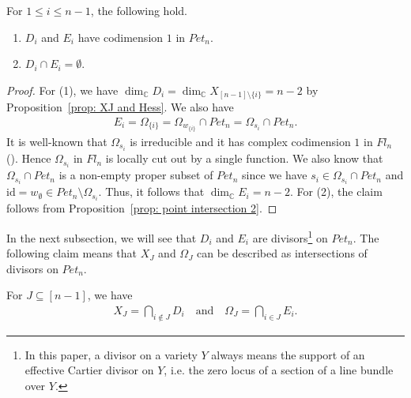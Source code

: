 \begin{lemma}\label{lem: divisors}
For $1\le i\le n-1$, the following hold. 
\begin{enumerate}
 \item $D_{i}$ and $E_{i}$ have codimension $1$ in $Pet_{n}$.
 \item $D_{i}\cap E_{i} = \emptyset$.
\end{enumerate}
\end{lemma}

\begin{proof}
For (1), we have $\dim_{{\mathbb C}}D_i=\dim_{{\mathbb C}} X_{[n-1]\setminus\{i\}} =n-2$ by Proposition~\ref{prop: XJ and Hess}. We also have 
\begin{align*}
E_{i} = \Omega_{\{i\}} = \Omega_{w_{\{i\}}}\cap Pet_{n}= \Omega_{s_i}\cap Pet_{n} .
\end{align*}
It is well-known that $\Omega_{s_i}$ is irreducible and it has complex codimension $1$ in $Fl_n$ (\cite[Sect.\ 10.2]{fult97}). Hence $\Omega_{s_i}$ in $Fl_n$ is locally cut out by a single function. We also know that $\Omega_{s_i}\cap Pet_{n}$ is a non-empty proper subset of $Pet_{n}$ since we have $s_i\in \Omega_{s_i}\cap Pet_{n}$ and $\text{id}=w_{\emptyset}\in Pet_{n}\setminus\Omega_{s_i}$. Thus, it follows that $\dim_{{\mathbb C}}E_{i} =n-2$. For (2), the claim follows from Proposition~\ref{prop: point intersection 2}.
\end{proof}

In the next subsection, we will see that $D_i$ and $E_i$ are divisors\footnote{In this paper, a divisor on a variety $Y$ always means the support of an effective Cartier divisor on $Y$, i.e. the zero locus of a section of a line bundle over $Y$.} on $Pet_{n}$. The following claim means that $X_J$ and $\Omega_J$ can be described as intersections of divisors on $Pet_{n}$.

\begin{prop}\label{prop: divisor expression}
For $J\subseteq [n-1]$, we have
\begin{align}\label{eq: div exp 10}
X_{J} =\bigcap_{i\notin J} D_i
\quad \text{and} \quad
\Omega_{J} = \bigcap_{i\in J} E_i .
\end{align}
\end{prop}

